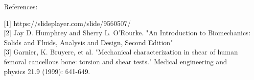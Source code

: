 \documentclass[12pt]{article}
\begin{document}
\begin{flushleft}
References:\
%

[1] https://slideplayer.com/slide/9560507/ \\
\vspace{0.5cm}
[2] Jay D. Humphrey and Sherry L. O’Rourke. "An Introduction to Biomechanics: Solids and Fluids, Analysis and Design, Second Edition"\\
\vspace{0.5cm}
[3] Garnier, K. Bruyere, et al. "Mechanical characterization in shear of human femoral cancellous bone: torsion and shear tests." Medical engineering and physics 21.9 (1999): 641-649. \

\end{flushleft}
\end{document}
